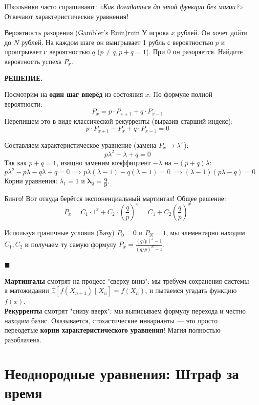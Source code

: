 \documentclass[12pt,a4paper]{article}
\newcommand{\E}{\mathbb{E}}
\newenvironment{solution}{
    \begin{tcolorbox}[
        enhanced, breakable, blanker,
        borderline west={2.5pt}{0pt}{solgray},
        left=12pt, top=5pt, bottom=5pt,
        before skip=10pt, after skip=15pt
    ]
    \textbf{\textsf{РЕШЕНИЕ.}}\;
}{
    \hfill $\blacksquare$
    \end{tcolorbox}
}
\begin{document}
Школьники часто спрашивают: \textit{«Как догадаться до этой функции без магии?»} Отвечают характеристические уравнения!

\begin{problem}{Вероятность разорения (Gambler's Ruin)}{ruin}
У игрока $x$ рублей. Он хочет дойти до $N$ рублей. На каждом шаге он выигрывает 1 рубль с вероятностью $p$ и проигрывает с вероятностью $q$ ($p \neq q, p+q=1$). При $0$ он разоряется. Найдите вероятность успеха $P_x$.
\end{problem}

\begin{solution}
Посмотрим на \textbf{один шаг вперёд} из состояния $x$. По формуле полной вероятности:
\[ P_x = p \cdot P_{x+1} + q \cdot P_{x-1} \]
Перепишем это в виде классической рекурренты (выразив старший индекс):
\[ p \cdot P_{x+1} - P_x + q \cdot P_{x-1} = 0 \]

Составляем характеристическое уравнение (замена $P_x \to \lambda^x$):
\[ p\lambda^2 - \lambda + q = 0 \]
Так как $p+q=1$, изящно заменим коэффициент $-\lambda$ на $-(p+q)\lambda$:
\[ p\lambda^2 - p\lambda - q\lambda + q = 0 \implies p\lambda(\lambda - 1) - q(\lambda - 1) = 0 \implies (\lambda - 1)(p\lambda - q) = 0 \]
Корни уравнения: $\lambda_1 = 1$ и $\bm{\lambda_2 = \frac{q}{p}}$. 

Бинго! Вот откуда берётся экспоненциальный мартингал! 
Общее решение:
\[ P_x = C_1 \cdot 1^x + C_2 \cdot \left(\frac{q}{p}\right)^x = C_1 + C_2 \left(\frac{q}{p}\right)^x \]

Используя граничные условия (Базу) $P_0 = 0$ и $P_N = 1$, мы элементарно находим $C_1, C_2$ и получаем ту самую формулу $P_x = \frac{(q/p)^x - 1}{(q/p)^N - 1}$.
\end{solution}

\begin{paradox}
\textbf{Мартингалы} смотрят на процесс "сверху вниз": мы требуем сохранения системы в матожидании $\E[f(X_{n+1}) \mid X_n] = f(X_n)$, и пытаемся угадать функцию $f(x)$. \\
\textbf{Рекурренты} смотрят "снизу вверх": мы выписываем формулу перехода и честно находим базис. Оказывается, стохастические инварианты — это просто переодетые \textbf{корни характеристического уравнения}! Магия полностью разоблачена.
\end{paradox}

\newpage
\section{Неоднородные уравнения: Штраф за время}
\end{document}

